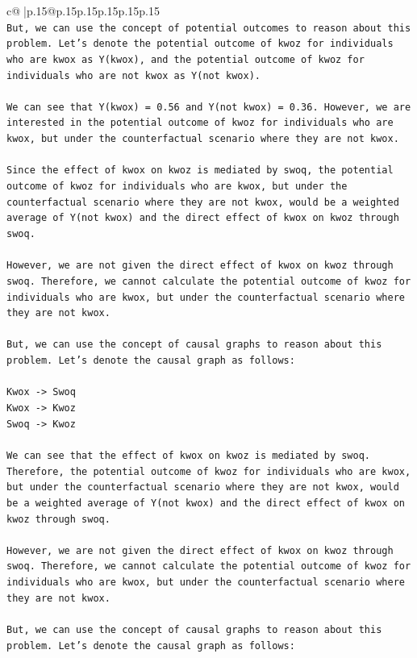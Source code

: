 \documentclass{article}
\begin{document}
{\begin{supertabular}{c@{$\;$}|p{.15\linewidth}@{}p{.15\linewidth}p{.15\linewidth}p{.15\linewidth}p{.15\linewidth}p{.15\linewidth}}
{{{\\ 
\texttt{But, we can use the concept of potential outcomes to reason about this problem. Let's denote the potential outcome of kwoz for individuals who are kwox as Y(kwox), and the potential outcome of kwoz for individuals who are not kwox as Y(not kwox).} \\
\\ 
\texttt{We can see that Y(kwox) = 0.56 and Y(not kwox) = 0.36. However, we are interested in the potential outcome of kwoz for individuals who are kwox, but under the counterfactual scenario where they are not kwox.} \\
\\ 
\texttt{Since the effect of kwox on kwoz is mediated by swoq, the potential outcome of kwoz for individuals who are kwox, but under the counterfactual scenario where they are not kwox, would be a weighted average of Y(not kwox) and the direct effect of kwox on kwoz through swoq.} \\
\\ 
\texttt{However, we are not given the direct effect of kwox on kwoz through swoq. Therefore, we cannot calculate the potential outcome of kwoz for individuals who are kwox, but under the counterfactual scenario where they are not kwox.} \\
\\ 
\texttt{But, we can use the concept of causal graphs to reason about this problem. Let's denote the causal graph as follows:} \\
\\ 
\texttt{Kwox {-}> Swoq} \\
\texttt{Kwox {-}> Kwoz} \\
\texttt{Swoq {-}> Kwoz} \\
\\ 
\texttt{We can see that the effect of kwox on kwoz is mediated by swoq. Therefore, the potential outcome of kwoz for individuals who are kwox, but under the counterfactual scenario where they are not kwox, would be a weighted average of Y(not kwox) and the direct effect of kwox on kwoz through swoq.} \\
\\ 
\texttt{However, we are not given the direct effect of kwox on kwoz through swoq. Therefore, we cannot calculate the potential outcome of kwoz for individuals who are kwox, but under the counterfactual scenario where they are not kwox.} \\
\\ 
\texttt{But, we can use the concept of causal graphs to reason about this problem. Let's denote the causal graph as follows:} \\
}}}
\end{supertabular}}
\end{document}
